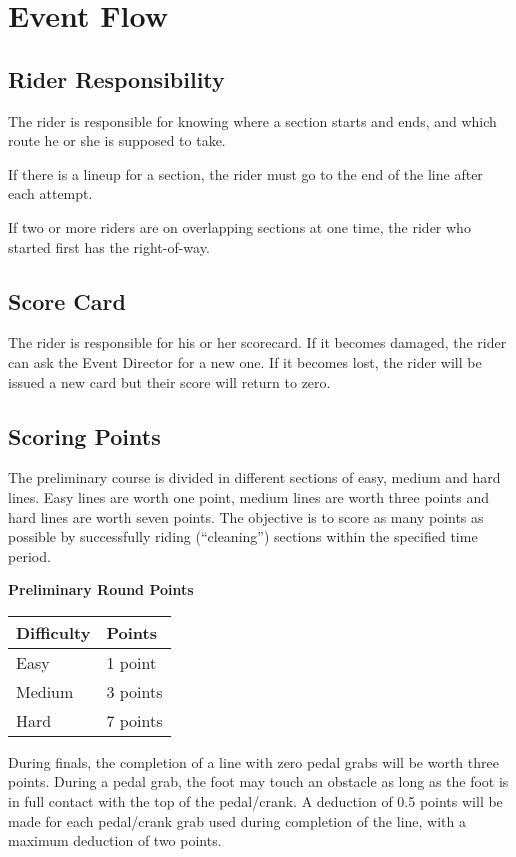 \section{Event Flow}

\subsection{Rider Responsibility}

The rider is responsible for knowing where a section starts and ends, and which route he or she is supposed to take.

If there is a lineup for a section, the rider must go to the end of the line after each attempt.

If two or more riders are on overlapping sections at one time, the rider who started first has the right-of-way.


\subsection{Score Card}
The rider is responsible for his or her scorecard.
If it becomes damaged, the rider can ask the Event Director for a new one.
If it becomes lost, the rider will be issued a new card but their score will return to zero.

\subsection{Scoring Points}
The preliminary course is divided in different sections of easy, medium and hard lines.
Easy lines are worth one point, medium lines are worth three points and hard lines are worth seven points.
The objective is to score as many points as possible by successfully riding (``cleaning'') sections within the specified time period.

\textbf{Preliminary Round Points}

\begin{tabular}{|l|l|}
\hline
\textbf{Difficulty} & \textbf{Points}\\
\hline
Easy & 1 point\\
\hline
Medium & 3 points\\
\hline
Hard & 7 points\\
\hline
\end{tabular}

During finals, the completion of a line with zero pedal grabs will be worth three points.
During a pedal grab, the foot may touch an obstacle as long as the foot is in full contact with the top of the pedal/crank.
A deduction of 0.5 points will be made for each pedal/crank grab used during completion of the line, with a maximum deduction of two points.

